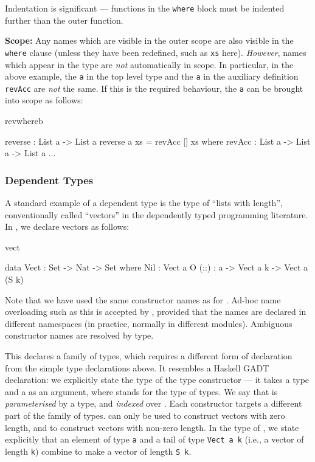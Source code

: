 \noindent
Indentation is significant --- functions in the \texttt{where} block must be indented
further than the outer function.

\textbf{Scope:} 
Any names which are visible in the outer scope are also visible in the \texttt{where}
clause (unless they have been redefined, such as \texttt{xs} here).
\emph{However}, names which appear in the type are \emph{not} automatically
in scope. In particular,
in the above example, the \texttt{a} in the top level type and the \texttt{a} in the
auxiliary definition \texttt{revAcc} are \emph{not} the same. If this is the required
behaviour, the \texttt{a} can be brought into scope as follows:

\begin{SaveVerbatim}{revwhereb}

reverse : List a -> List a
reverse {a} xs = revAcc [] xs where
  revAcc : List a -> List a -> List a
  ...

\end{SaveVerbatim}

\subsubsection{Dependent Types}

A standard example of a dependent type is the type of ``lists with length'',
conventionally called ``vectors'' in the dependently typed programming
literature. In \Idris{}, we declare vectors as follows:

\begin{SaveVerbatim}{vect}

data Vect : Set -> Nat -> Set where
   Nil  : Vect a O
   (::) : a -> Vect a k -> Vect a (S k)

\end{SaveVerbatim}

\noindent
Note that we have used the same constructor names as for . Ad-hoc
name overloading such as this is accepted by \Idris{}, provided that the names
are declared in different namespaces (in practice, normally in different modules).
Ambiguous constructor names are resolved by type. 

This declares a family of types, which requires a different form of declaration
from the simple type declarations above. It resembles a Haskell GADT
declaration: we explicitly state the type
of the type constructor  --- it takes a type and a  as an
argument, where  stands for the type of types. We say that 
is \emph{parameterised} by a type, and \emph{indexed} over . Each
constructor targets a different part of the family of types.  can only
be used to construct vectors with zero length, and \tDC{::} to construct
vectors with non-zero length. In the type of \tDC{::}, we state explicitly that an element
of type \texttt{a} and a tail of type \texttt{Vect a k} (i.e., a vector of length \texttt{k})
combine to make a vector of length \texttt{S k}.

